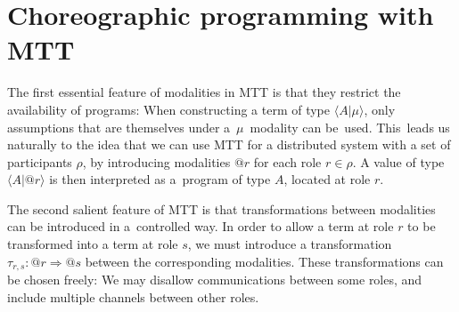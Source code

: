 \documentclass{scrartcl}
\theoremstyle{definition}
\theoremstyle{plain}
\begin{document}

\section{Choreographic programming with MTT}
The first essential feature of modalities in MTT is that they restrict the
availability of programs: When constructing a term of type $\langle A | \mu
\rangle$, only assumptions that are themselves under a~$\mu$~modality can
be~used. This~leads us naturally to the idea that we can use MTT for a
distributed system with a set of participants $\rho$, by introducing modalities
$@r$ for each role $r \in \rho$. A value of type $\langle A | @r \rangle$ is
then interpreted as a~program of type $A$, located at role $r$.

The second salient feature of MTT is that transformations between modalities
can be introduced in a~controlled way. In order to allow a term at role $r$ to
be transformed into a term at role $s$, we must introduce a transformation
$\tau_{r,s} : @r \Rightarrow @s$ between the corresponding modalities. These
transformations can be chosen freely: We may disallow communications between
some roles, and include multiple channels between other roles.


\end{document}
